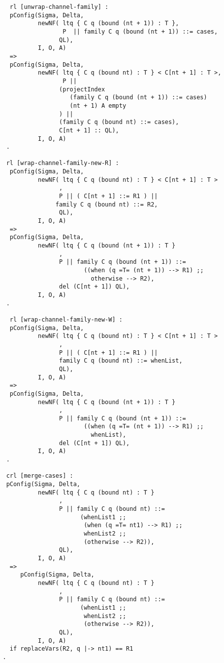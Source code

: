 \begin{lstlisting}
     rl [unwrap-channel-family] :
     pConfig(Sigma, Delta, 
             newNF( ltq { C q (bound (nt + 1)) : T },
                    P  || family C q (bound (nt + 1)) ::= cases, 
                   QL),
             I, O, A)  
     => 
     pConfig(Sigma, Delta, 
             newNF( ltq { C q (bound nt) : T } < C[nt + 1] : T >,
                    P || 
                   (projectIndex 
                      (family C q (bound (nt + 1)) ::= cases) 
                      (nt + 1) A empty
                   ) ||
                   (family C q (bound nt) ::= cases), 
                   C[nt + 1] :: QL),
             I, O, A)  
    .  
    
    rl [wrap-channel-family-new-R] :
     pConfig(Sigma, Delta, 
             newNF( ltq { C q (bound nt) : T } < C[nt + 1] : T >
                   , 
                   P || ( C[nt + 1] ::= R1 ) || 
                  family C q (bound nt) ::= R2,
                   QL),
             I, O, A) 
     =>
     pConfig(Sigma, Delta, 
             newNF( ltq { C q (bound (nt + 1)) : T }
                   , 
                   P || family C q (bound (nt + 1)) ::= 
                          ((when (q =T= (nt + 1)) --> R1) ;; 
                            otherwise --> R2),
                   del (C[nt + 1]) QL),
             I, O, A)
    .  
    
     rl [wrap-channel-family-new-W] :
     pConfig(Sigma, Delta, 
             newNF( ltq { C q (bound nt) : T } < C[nt + 1] : T >
                   , 
                   P || ( C[nt + 1] ::= R1 ) || 
                   family C q (bound nt) ::= whenList,
                   QL),
             I, O, A) 
     =>
     pConfig(Sigma, Delta, 
             newNF( ltq { C q (bound (nt + 1)) : T }
                   , 
                   P || family C q (bound (nt + 1)) ::= 
                          ((when (q =T= (nt + 1)) --> R1) ;; 
                            whenList),
                   del (C[nt + 1]) QL),
             I, O, A)
    . 
      
    crl [merge-cases] :                 
    pConfig(Sigma, Delta, 
             newNF( ltq { C q (bound nt) : T }
                   , 
                   P || family C q (bound nt) ::= 
                         (whenList1 ;;
                          (when (q =T= nt1) --> R1) ;;
                          whenList2 ;;
                          (otherwise --> R2)),
                   QL),
             I, O, A) 
     => 
        pConfig(Sigma, Delta, 
             newNF( ltq { C q (bound nt) : T }
                   , 
                   P || family C q (bound nt) ::= 
                         (whenList1 ;;
                          whenList2 ;;
                          (otherwise --> R2)),
                   QL),
             I, O, A) 
     if replaceVars(R2, q |-> nt1) == R1 
   .   

\end{lstlisting}